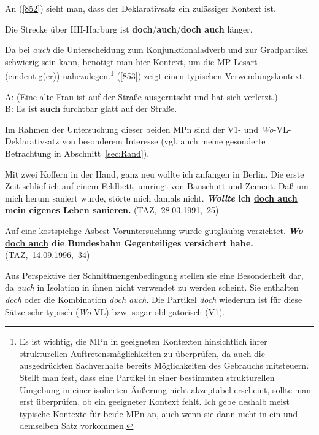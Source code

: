 {An (\ref{852}) sieht man, dass der Deklarativsatz ein zulässiger Kontext ist.

\begin{exe}
	\ex\label{852}
	Die Strecke über HH-Harburg ist \textbf{doch}/\textbf{auch}/\textbf{doch auch} länger.
\end{exe}
Da bei \textit{auch} die Unterscheidung zum Konjunktionaladverb  und zur Gradpartikel  schwierig sein kann, benötigt man hier Kontext, um die MP-Lesart (eindeutig(er)) nahezulegen.\footnote{Es ist wichtig, die MPn in geeigneten Kontexten hinsichtlich ihrer strukturellen Auftretensmäglichkeiten zu überprüfen, da auch die ausgedrückten Sachverhalte bereits Möglichkeiten des Gebrauchs mitsteuern. Stellt man fest, dass eine Partikel in einer bestimmten strukturellen Umgebung in einer isolierten Äußerung nicht akzeptabel erscheint, sollte man erst überprüfen, ob ein geeigneter Kontext fehlt. Ich gebe deshalb meist typische Kontexte für beide MPn an, auch wenn sie dann nicht in ein und demselben Satz vorkommen.} (\ref{853}) zeigt einen typischen Verwendungskontext.

\begin{exe}
	\ex\label{853}
	A: (Eine alte Frau ist auf der Straße ausgerutscht und hat sich verletzt.)\\
	B: Es ist \textbf{auch} furchtbar glatt auf der Straße.
	\hfill\hbox {\citet[88]{Helbig1990}}
\end{exe}
Im Rahmen der Untersuchung dieser beiden MPn sind  der V1- und \textit{Wo}-VL-Deklara\-tivsatz  von besonderem Interesse (vgl. auch meine gesonderte Betrachtung in Abschnitt~\ref{sec:Rand}).

\begin{exe}
	\ex\label{854}
	\scriptsize
	Mit zwei Koffern in der Hand, ganz neu wollte ich anfangen in Berlin. Die erste Zeit schlief ich auf einem Feldbett, umringt von Bauschutt und Zement. 		Daß um mich herum saniert wurde, störte mich damals nicht. \textbf{\textit{Wollte} ich \underline{doch auch} mein eigenes Leben sanieren.}  	
	\hfill\hbox {(TAZ, 28.03.1991, 25)}
	\newline
	\hbox{}\hfill\hbox {\citet[74-75]{Kwon2005}}
\end{exe}
   
\begin{exe}
	\ex\label{855}
	\scriptsize
	Auf eine kostspielige Asbest-Voruntersuchung wurde gutgläubig verzichtet. \textbf{\textit{Wo} \underline{doch auch} die Bundesbahn Gegenteiliges 			versichert habe.} 
	\hfill\hbox {(TAZ, 14.09.1996, 34)}
	\newline
	\hbox{}\hfill\hbox {\citet[75]{Kwon2005}}
\end{exe}  
Aus Perspektive der Schnittmengenbedingung  stellen sie eine Besonderheit dar, da \textit{auch} in Isolation in ihnen nicht verwendet zu werden scheint. Sie enthalten \textit{doch} oder die Kombination \textit{doch auch}. Die Partikel \textit{doch} wiederum ist für diese Sätze sehr typisch (\textit{Wo}-VL) bzw. sogar obligatorisch (V1).\\

}
